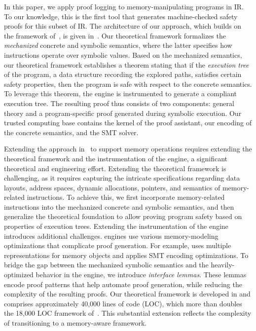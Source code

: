 In this paper, we apply proof logging to memory-manipulating programs in \llvm IR.
To our knowledge,
this is the first tool that generates machine-checked safety proofs for this subset of \llvm IR.
The architecture of our approach, which builds on the framework of~\cite{klee-rocq}, is given in~.
Our theoretical framework formalizes the \emph{mechanized} concrete and symbolic semantics,
where the latter specifies how instructions operate over symbolic values.
Based on the mechanized semantics,
our theoretical framework establishes a theorem stating that if the \emph{execution tree} of the program,
a data structure recording the explored paths,
satisfies certain safety properties, then the program is safe with respect to the concrete semantics.
To leverage this theorem, %
the \SE engine is instrumented to generate a compliant execution tree.
The resulting proof thus consists of two components:
general theory and a program-specific proof generated during symbolic execution.
Our trusted computing base contains the kernel of the proof assistant, our encoding of the concrete semantics, and the SMT solver.

Extending the approach in~\cite{klee-rocq} to support memory operations requires extending the theoretical framework and the instrumentation of the \SE engine,
a significant theoretical and engineering effort.
Extending the theoretical framework is challenging,
as it requires capturing the intricate specifications regarding data layouts, address spaces, dynamic allocations, pointers, and semantics of memory-related instructions.
To achieve this,
we first incorporate memory-related instructions into the mechanized concrete and symbolic semantics,
and then generalize the theoretical foundation to allow proving program safety based on properties of execution trees.
Extending the instrumentation of the \SE engine introduces additional challenges.
\SE engines use various memory-modeling optimizations that complicate proof generation.
For example, \klee uses multiple representations for memory objects and applies SMT encoding optimizations.
To bridge the gap between the mechanized symbolic semantics and the heavily-optimized behavior in the \SE engine, we introduce \emph{interface lemmas}.
These lemmas encode proof patterns that help automate proof generation, %
while reducing the complexity of the resulting proofs.
Our theoretical framework is developed in \coq and comprises approximately 40,000 lines of code (LOC),
which more than doubles the 18,000 LOC framework of~\cite{klee-rocq}.
This substantial extension reflects the complexity of transitioning to a memory-aware framework.

